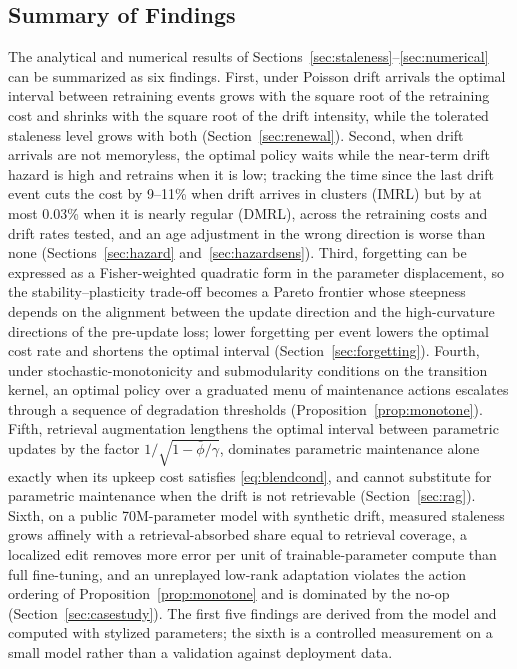 \documentclass[electronics,article,submit,pdftex,moreauthors]{Definitions/mdpi}
\newcommand{\phibar}{\bar{\phi}}
\begin{document}
\subsection{Summary of Findings}

The analytical and numerical results of Sections~\ref{sec:staleness}--\ref{sec:numerical} can be summarized as six findings. First, under Poisson drift arrivals the optimal interval between retraining events grows with the square root of the retraining cost and shrinks with the square root of the drift intensity, while the tolerated staleness level grows with both (Section~\ref{sec:renewal}). Second, when drift arrivals are not memoryless, the optimal policy waits while the near-term drift hazard is high and retrains when it is low; tracking the time since the last drift event cuts the cost by 9--11\% when drift arrives in clusters (IMRL) but by at most 0.03\% when it is nearly regular (DMRL), across the retraining costs and drift rates tested, and an age adjustment in the wrong direction is worse than none (Sections~\ref{sec:hazard} and~\ref{sec:hazardsens}). Third, forgetting can be expressed as a Fisher-weighted quadratic form in the parameter displacement, so the stability--plasticity trade-off becomes a Pareto frontier whose steepness depends on the alignment between the update direction and the high-curvature directions of the pre-update loss; lower forgetting per event lowers the optimal cost rate and shortens the optimal interval (Section~\ref{sec:forgetting}). Fourth, under stochastic-monotonicity and submodularity conditions on the transition kernel, an optimal policy over a graduated menu of maintenance actions escalates through a sequence of degradation thresholds (Proposition~\ref{prop:monotone}). Fifth, retrieval augmentation lengthens the optimal interval between parametric updates by the factor $1/\sqrt{1-\phibar/\gamma}$, dominates parametric maintenance alone exactly when its upkeep cost satisfies \eqref{eq:blendcond}, and cannot substitute for parametric maintenance when the drift is not retrievable (Section~\ref{sec:rag}). Sixth, on a public 70M-parameter model with synthetic drift, measured staleness grows affinely with a retrieval-absorbed share equal to retrieval coverage, a localized edit removes more error per unit of trainable-parameter compute than full fine-tuning, and an unreplayed low-rank adaptation violates the action ordering of Proposition~\ref{prop:monotone} and is dominated by the no-op (Section~\ref{sec:casestudy}). The first five findings are derived from the model and computed with stylized parameters; the sixth is a controlled measurement on a small model rather than a validation against deployment data.
\end{document}
